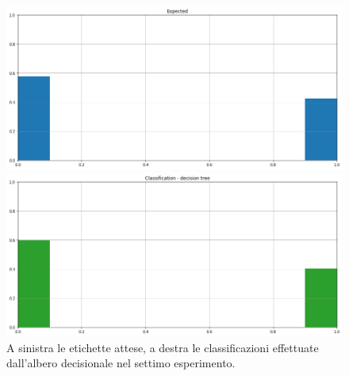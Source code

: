 \documentclass[12pt]{report}
\theoremstyle{definition}
\begin{document}
\begin{figure}
\centering
    \begin{minipage}{0.48\textwidth}
        \includegraphics[width=\linewidth]{images/experiment_kaggle/expected_classification.png}
    \end{minipage}
    \begin{minipage}{0.48\textwidth}
        \includegraphics[width=\linewidth]{images/experiment_kaggle/prediction_classification_dectree.png}
    \end{minipage}
    \caption{A sinistra le etichette attese, a destra le classificazioni effettuate dall'albero decisionale nel settimo esperimento.}
    \label{dt_exp7}
\end{figure} 
\end{document}
